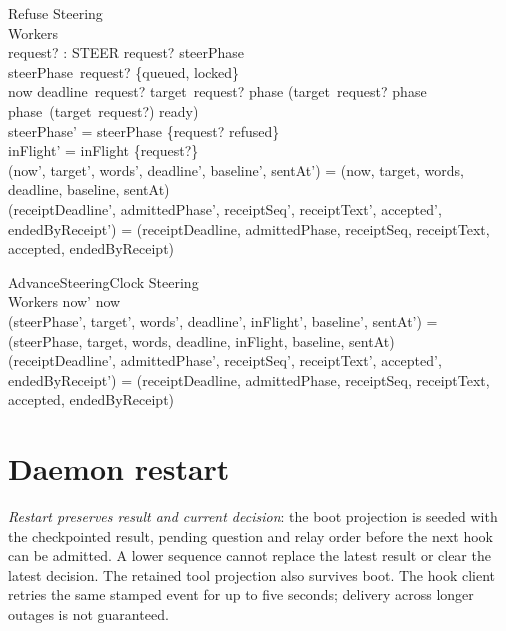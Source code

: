 \documentclass[a4paper,10pt,fleqn]{article}
\begin{document}
\begin{schema}{Refuse}
  \Delta Steering \\
  \Xi Workers \\
  request? : STEER
\where
  request? \in \dom steerPhase \\
  steerPhase~request? \in \{queued, locked\} \\
  now \geq deadline~request? \lor target~request? \notin \dom phase \lor
    (target~request? \in \dom phase \land phase~(target~request?) \neq ready) \\
  steerPhase' = steerPhase \oplus \{request? \mapsto refused\} \\
  inFlight' = inFlight \nrres \{request?\} \\
  (now', target', words', deadline', baseline', sentAt') =
    (now, target, words, deadline, baseline, sentAt) \\
  (receiptDeadline', admittedPhase', receiptSeq', receiptText', accepted', endedByReceipt') =
    (receiptDeadline, admittedPhase, receiptSeq, receiptText, accepted, endedByReceipt)
\end{schema}

\begin{schema}{AdvanceSteeringClock}
  \Delta Steering \\
  \Xi Workers
\where
  now' \geq now \\
  (steerPhase', target', words', deadline', inFlight', baseline', sentAt') =
    (steerPhase, target, words, deadline, inFlight, baseline, sentAt) \\
  (receiptDeadline', admittedPhase', receiptSeq', receiptText', accepted', endedByReceipt') =
    (receiptDeadline, admittedPhase, receiptSeq, receiptText, accepted, endedByReceipt)
\end{schema}

\section{Daemon restart}

\emph{Restart preserves result and current decision}: the boot projection
is seeded with the checkpointed result, pending question and relay order
before the next hook can be admitted. A lower sequence cannot replace the
latest result or clear the latest decision. The retained tool projection
also survives boot. The hook client retries the same stamped event for up
to five seconds; delivery across longer outages is not guaranteed.

\begin{zed}
\end{zed}
\end{document}
